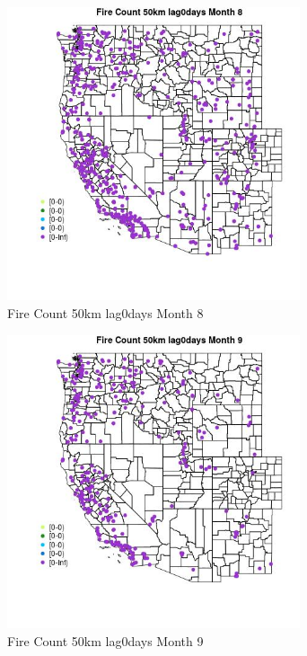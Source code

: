 \begin{figure} 
\centering  
\includegraphics[width=0.77\textwidth]{Code_Outputs/Report_ML_input_PM25_Step4_part_e_de_duplicated_aves_compiled_2019-05-18wNAs_MapObsMo8Fire_Count_50km_lag0days.jpg} 
\caption{\label{fig:Report_ML_input_PM25_Step4_part_e_de_duplicated_aves_compiled_2019-05-18wNAsMapObsMo8Fire_Count_50km_lag0days}Fire Count 50km lag0days Month 8} 
\end{figure} 
 

\begin{figure} 
\centering  
\includegraphics[width=0.77\textwidth]{Code_Outputs/Report_ML_input_PM25_Step4_part_e_de_duplicated_aves_compiled_2019-05-18wNAs_MapObsMo9Fire_Count_50km_lag0days.jpg} 
\caption{\label{fig:Report_ML_input_PM25_Step4_part_e_de_duplicated_aves_compiled_2019-05-18wNAsMapObsMo9Fire_Count_50km_lag0days}Fire Count 50km lag0days Month 9} 
\end{figure} 
 


